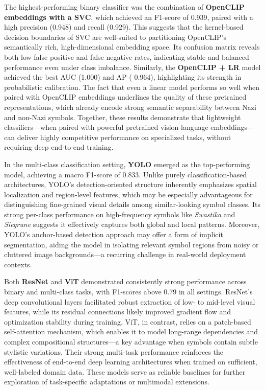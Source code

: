 The highest-performing binary classifier was the combination of
\textbf{OpenCLIP embeddings with a \ac{SVC}}, which achieved an F1-score of 0.939, paired
with a high precision (0.948) and recall (0.929). This suggests that the kernel-based decision boundaries of \ac{SVC} are
well-suited to partitioning OpenCLIP’s semantically rich, high-dimensional embedding space. Its confusion matrix
reveals both low false positive and false negative rates, indicating stable and balanced performance even under
class imbalance. Similarly, the \textbf{OpenCLIP + \ac{LR}} model achieved the best \ac{AUC} (1.000) and \ac{AP} (
0.964), highlighting its strength in probabilistic calibration. The fact that even a linear model performs so well
when paired with OpenCLIP embeddings underlines the quality of these pretrained representations, which already
encode strong semantic separability between Nazi and non-Nazi symbols. Together, these results demonstrate that
lightweight classifiers—when paired with powerful pretrained vision-language embeddings—can deliver highly
competitive performance on specialized tasks, without requiring deep end-to-end training.

In the multi-class classification setting, \textbf{\ac{YOLO}} emerged as the top-performing model, achieving a macro
F1-score of 0.833. Unlike purely classification-based architectures, \ac{YOLO}’s detection-oriented structure inherently
emphasizes spatial localization and region-level features, which may be especially advantageous for distinguishing
fine-grained visual details among similar-looking symbol classes. Its strong per-class performance on high-frequency
symbols like \textit{Swastika} and \textit{Siegrune} suggests it effectively captures both global and local
patterns. Moreover, \ac{YOLO}’s anchor-based detection approach may offer a form of implicit segmentation, aiding the
model in isolating relevant symbol regions from noisy or cluttered image backgrounds—a recurring challenge in
real-world deployment contexts.

Both \textbf{ResNet} and \textbf{\ac{ViT}} demonstrated consistently strong performance across binary and multi-class
tasks, with F1-scores above 0.79 in all settings. ResNet’s deep convolutional layers facilitated robust extraction
of low- to mid-level visual features, while its residual connections likely improved gradient flow and optimization
stability during training. \ac{ViT}, in contrast, relies on a patch-based self-attention mechanism, which enables it to
model long-range dependencies and complex compositional structures—a key advantage when symbols contain subtle
stylistic variations. Their strong multi-task performance reinforces the effectiveness of end-to-end deep learning
architectures when trained on sufficient, well-labeled domain data. These models serve as reliable baselines for
further exploration of task-specific adaptations or multimodal extensions.

